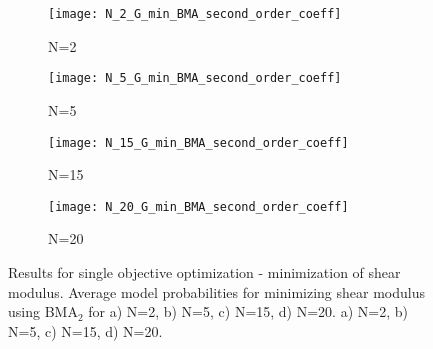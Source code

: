 \documentclass[preprint,amsmath,amssymb,aps, prb,showkeys]{revtex4-1}
\begin{document}
\begin{figure}[htp]
        \parbox{.975\textwidth}{
            \begin{subfigure}{.475\linewidth}
                \texttt{[image: N\_2\_G\_min\_BMA\_second\_order\_coeff]}
                \caption{N=2}
                \label{fig:G_min_so_coeff_N_2_BMA}
        \end{subfigure}
            \begin{subfigure}{.475\linewidth}
                \texttt{[image: N\_5\_G\_min\_BMA\_second\_order\_coeff]}
                \caption{N=5}
                \label{fig:G_min_so_coeff_N_5_BMA}
        \end{subfigure}
            \begin{subfigure}{.475\linewidth}
                \texttt{[image: N\_15\_G\_min\_BMA\_second\_order\_coeff]}
                \caption{N=15}
                \label{fig:G_min_so_coeff_N_15_BMA}
        \end{subfigure}
            \begin{subfigure}{.475\linewidth}
                \texttt{[image: N\_20\_G\_min\_BMA\_second\_order\_coeff]}
                \caption{N=20}
                \label{fig:G_min_so_coeff_N_20_BMA}
        \end{subfigure}
        }
        \caption{ Results for single objective optimization - minimization of shear modulus. Average model probabilities for minimizing shear modulus using BMA$_2$ for a) N=2, b) N=5, c) N=15, d) N=20. a) N=2, b) N=5, c) N=15, d) N=20.}
        \label{fig:G_min_so_coeff_BMA}       
\end{figure} 
\end{document}
